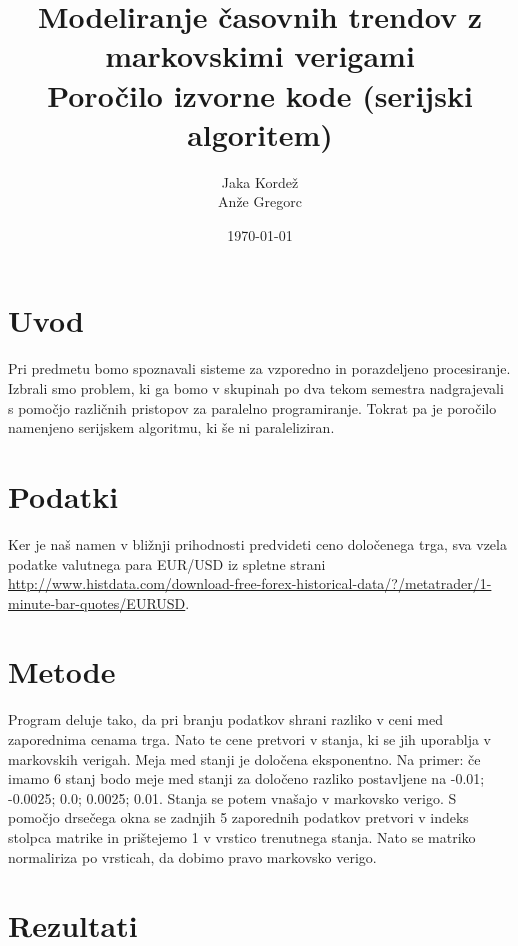 \documentclass[a4paper,11pt]{article}
\title{Modeliranje časovnih trendov z markovskimi verigami \\ \large  Poročilo izvorne kode (serijski algoritem)}
\author{Jaka Kordež \\ Anže Gregorc}
\date{\today}
\begin{document}
\maketitle

\section{Uvod}

Pri predmetu bomo spoznavali sisteme za vzporedno in porazdeljeno procesiranje. Izbrali smo problem, ki ga bomo v skupinah po dva tekom semestra nadgrajevali s pomočjo različnih pristopov za paralelno programiranje. Tokrat pa je poročilo namenjeno serijskem algoritmu, ki še ni paraleliziran. 

\section{Podatki}

Ker je naš namen v bližnji prihodnosti predvideti ceno določenega trga, sva vzela podatke valutnega para EUR/USD iz spletne strani \url{http://www.histdata.com/download-free-forex-historical-data/?/metatrader/1-minute-bar-quotes/EURUSD}.

\section{Metode}

Program deluje tako, da pri branju podatkov shrani razliko v ceni med zaporednima cenama trga. Nato te cene pretvori v stanja, ki se jih uporablja v markovskih verigah. Meja med stanji je določena eksponentno. Na primer: če imamo 6 stanj bodo meje med stanji za določeno razliko postavljene na -0.01; -0.0025; 0.0; 0.0025; 0.01. Stanja se potem vnašajo v markovsko verigo. S pomočjo drsečega okna se zadnjih 5 zaporednih podatkov pretvori v indeks stolpca matrike in prištejemo 1 v vrstico trenutnega stanja. Nato se matriko normaliriza  po vrsticah, da dobimo pravo markovsko verigo.


\section{Rezultati}
\end{document}
